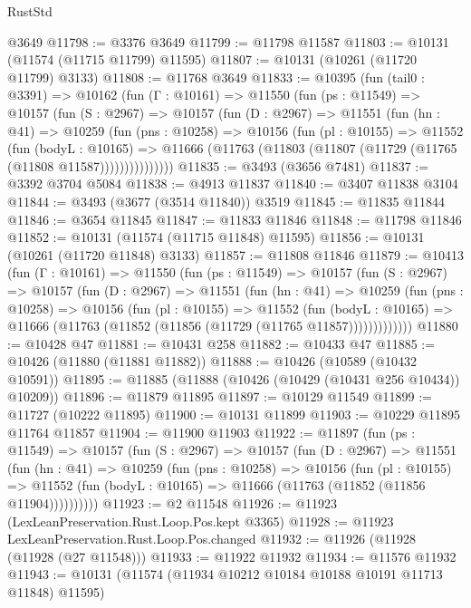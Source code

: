 \begin{lexlean}{RustStd}
\begin{coremodule}
    @3649
@11798 := @3376 @3649
@11799 := @11798 @11587
@11803 := @10131 (@11574 (@11715 @11799) @11595)
@11807 := @10131 (@10261 (@11720 @11799) @3133)
@11808 := @11768 @3649
@11833 := @10395
    (fun (tail0 : @3391) =>
    @10162
      (fun (Γ : @10161) =>
      @11550
        (fun (ps : @11549) =>
        @10157
          (fun (S : @2967) =>
          @10157
            (fun (D : @2967) =>
            @11551
              (fun (hn : @41) =>
              @10259
                (fun (pns : @10258) =>
                @10156
                  (fun (pl : @10155) =>
                  @11552
                    (fun (bodyL : @10165) =>
                    @11666 (@11763 (@11803 (@11807 (@11729 (@11765 (@11808 @11587)))))))))))))))
@11835 := @3493 (@3656 @7481)
@11837 := @3392 @3704 @5084
@11838 := @4913 @11837
@11840 := @3407 @11838 @3104
@11844 := @3493 (@3677 (@3514 @11840)) @3519
@11845 := @11835 @11844
@11846 := @3654 @11845
@11847 := @11833 @11846
@11848 := @11798 @11846
@11852 := @10131 (@11574 (@11715 @11848) @11595)
@11856 := @10131 (@10261 (@11720 @11848) @3133)
@11857 := @11808 @11846
@11879 := @10413
    (fun (Γ : @10161) =>
    @11550
      (fun (ps : @11549) =>
      @10157
        (fun (S : @2967) =>
        @10157
          (fun (D : @2967) =>
          @11551
            (fun (hn : @41) =>
            @10259
              (fun (pns : @10258) =>
              @10156
                (fun (pl : @10155) =>
                @11552
                  (fun (bodyL : @10165) =>
                  @11666 (@11763 (@11852 (@11856 (@11729 (@11765 @11857)))))))))))))
@11880 := @10428 @47
@11881 := @10431 @258
@11882 := @10433 @47
@11885 := @10426 (@11880 (@11881 @11882))
@11888 := @10426 (@10589 (@10432 @10591))
@11895 := @11885 (@11888 (@10426 (@10429 (@10431 @256 @10434)) @10209))
@11896 := @11879 @11895
@11897 := @10129 @11549
@11899 := @11727 (@10222 @11895)
@11900 := @10131 @11899
@11903 := @10229 @11895 @11764 @11857
@11904 := @11900 @11903
@11922 := @11897
    (fun (ps : @11549) =>
    @10157
      (fun (S : @2967) =>
      @10157
        (fun (D : @2967) =>
        @11551
          (fun (hn : @41) =>
          @10259
            (fun (pns : @10258) =>
            @10156
              (fun (pl : @10155) =>
              @11552 (fun (bodyL : @10165) => @11666 (@11763 (@11852 (@11856 @11904))))))))))
@11923 := @2 @11548
@11926 := @11923 (LexLeanPreservation.Rust.Loop.Pos.kept @3365)
@11928 := @11923 LexLeanPreservation.Rust.Loop.Pos.changed
@11932 := @11926 (@11928 (@11928 (@27 @11548)))
@11933 := @11922 @11932
@11934 := @11576 @11932
@11943 := @10131 (@11574 (@11934 @10212 @10184 @10188 @10191 @11713 @11848) @11595)

\end{coremodule}
\end{lexlean}
